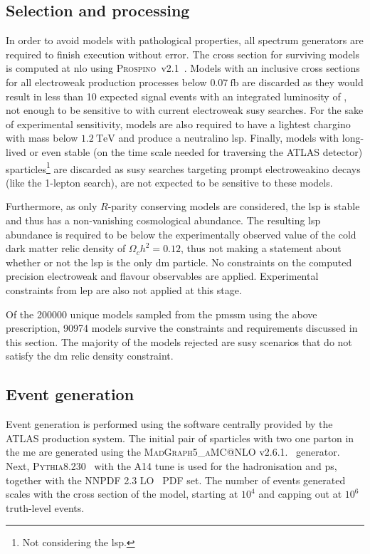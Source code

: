 \subsection{Selection and processing}

In order to avoid models with pathological properties, all spectrum generators are required to finish execution without error. The cross section for surviving models is computed at \gls{nlo} using \textsc{Prospino}~v2.1~\cite{prospino:314229, prospino_2:1999xh}. Models with an inclusive cross sections for all electroweak production processes below $\SI{0.07}{\femto\barn}$ are discarded as they would result in less than 10 expected signal events with an integrated luminosity of \onethirtynineifb, not enough to be sensitive to with current electroweak \gls{susy} searches. For the sake of experimental sensitivity, models are also required to have a lightest chargino with mass below $\SI{1.2}{\TeV}$ and produce a neutralino \gls{lsp}. Finally, models with long-lived or even stable (on the time scale needed for traversing the ATLAS detector) sparticles\footnote{Not considering the \gls{lsp}.} are discarded as \gls{susy} searches targeting prompt electroweakino decays (like the 1-lepton search), are not expected to be sensitive to these models. 

Furthermore, as only $R$-parity conserving models are considered, the \gls{lsp} is stable and thus has a non-vanishing cosmological abundance. The resulting \gls{lsp} abundance is required to be below the experimentally observed value of the cold dark matter relic density of $\Omega_c h^2 = 0.12$, thus not making a statement about whether or not the \gls{lsp} is the only \gls{dm} particle. No constraints on the computed precision electroweak and flavour observables are applied. Experimental constraints from \eg \gls{lep} are also not applied at this stage. 

Of the \num[group-separator={,}]{200000} unique models sampled from the \gls{pmssm} using the above prescription, \num[group-separator={,}]{90974} models survive the constraints and requirements discussed in this section. The majority of the models rejected are \gls{susy} scenarios that do not satisfy the \gls{dm} relic density constraint.

\subsection{Event generation}

Event generation is performed using the software centrally provided by the ATLAS production system. The initial pair of sparticles with two one parton in the \gls{me} are generated using the \textsc{MadGraph5\_aMC@NLO} v2.6.1.~\cite{MGaMCNLO:2014hca,Frederix:2012ps} generator. Next, \textsc{Pythia8.230}~\cite{Pythia8:2007gs}  with the \textsc{A14} tune is used for the hadronisation and \gls{ps}, together with the NNPDF 2.3 LO~\cite{Ball:2012cx} \gls{PDF} set. The number of events generated scales with the cross section of the model, starting at $10^4$ and capping out at $10^6$ truth-level events.
		
